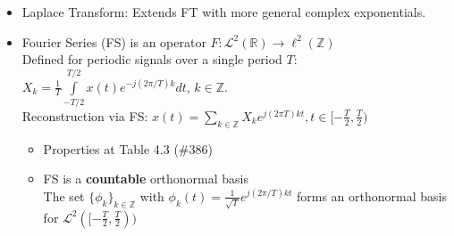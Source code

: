 \documentclass{article}
\newcommand{\ie}{\textit{i.e. }}
\newcommand{\cg}{\color{gray}}
\newcommand{\fs}{\footnotesize}
\begin{document}
\begin{itemize}
\begin{itemize}
\item !IMPORTANT! FT facilitates the characterization of boundedness and continuousness (and differentiability)\\
{\cg\fs For some positive $\gamma, \epsilon$: \\
(i) $|X(\omega)| \le \frac{\gamma}{1+|\omega|^{1+\epsilon}} \implies $ $x$ is bounded and continuous (\ie $x \in C^{0}$) \\
(ii) $|X(\omega)| \le \frac{\gamma}{1+|\omega|^{1+\epsilon+q}} \implies $ $x\in C^{q}$ (has $q$ cont derivs) \\
(iii) $x \in C^{q}$ and $x$ is bounded (but not necess. cont.) $\implies$ $|X(\omega)| \le \frac{\gamma}{1+|\omega|^{1+q}}$  \\
(to understand these better see example 4.8 \#376)
}
\item Lipschitz Regularity {generalizes the above to differentiablity of fractional order:}\\
\item !critical! Lipschitz regularity can describe whether a fn is continuous ALMOST everywhere {\cg (\ie being of Lipschitz order of $1-\epsilon$ for any $\epsilon>0$  means being almost of order $1$, see \#378)}
{\cg\fs
Let $\alpha \in [0,1)$. Then $x$ is \textit{pointwise Lipschitz} of order $\alpha$ at $t_0$ when $|x(t)-x(t_0)|\le c|t-t_0|^\alpha$. \\
In FT context; a fn $x$ is bounded and \textit{uniformly} Lipschitz over $\alpha$ when: $\int\limits_{-\infty}^{\infty} |X(\omega)|(1+|\omega|^\alpha)d\omega < \infty$
}
\end{itemize}
\item Laplace Transform: Extends FT with more general complex exponentials. 
\item Fourier Series (FS) is an operator $F: \mathcal{L}^2(\mathbb{R}) \rightarrow \ell^2(\mathbb{Z})$\\
{\cg Defined for periodic signals over a single period $T$: \\
$X_k=\frac{1}{T}\int\limits_{-T/2}^{T/2}x(t)e^{-j(2\pi/T)k}dt$, $k \in \mathbb{Z}$. \\
Reconstruction via FS: $x(t) = \sum\limits_{k\in\mathbb{Z}}X_k e^{j(2\pi T)kt}, t\in [-\frac{T}{2},\frac{T}{2})$
}
\begin{itemize}
\item Properties at Table 4.3 (\#386)
\item FS is a \textbf{countable} orthonormal basis\\
{\cg The set $\{\phi_k\}_{k\in\mathbb{Z}}$ with $\phi_k(t)=\frac{1}{\sqrt{T}}e^{j(2\pi/T)kt}$ forms an orthonormal basis for $\mathcal{L}^{2}([-\frac{T}{2},\frac{T}{2}))$ \\
}
\end{itemize}
\end{itemize}
\end{document}
